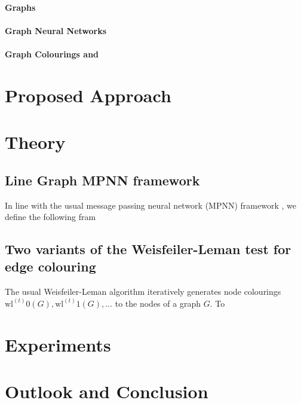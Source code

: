 \documentclass{article}
\newcommand{\iter}[1][t]{^{(#1)}}
\newcommand{\wl}{\text{wl}}
\begin{document}
\paragraph{Graphs}

\paragraph{Graph Neural Networks}

\paragraph{Graph Colourings and }




\section{Proposed Approach}




\section{Theory}

\subsection{Line Graph MPNN framework}

In line with the usual message passing neural network (MPNN) framework \cite{gilmer2017neural}, we define the following fram


\subsection{Two variants of the Weisfeiler-Leman test for edge colouring}

The usual Weisfeiler-Leman algorithm iteratively generates node colourings $\wl\iter{0}(G), \wl\iter{1}(G), \dots$ to the nodes of a graph $G$. To  




\section{Experiments}



\section{Outlook and Conclusion}






\end{document}
